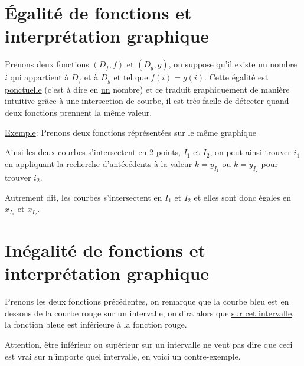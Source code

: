 \documentclass[french]{book}
\begin{document}
\section{Égalité de fonctions et interprétation graphique}

Prenons deux fonctions $(D_f,f)$ et $(D_g,g)$, on suppose qu'il existe un nombre $i$ qui appartient à $D_f$ et à $D_g$ et tel que $f(i)=g(i)$. Cette égalité est \underline{ponctuelle} (c'est à dire en \underline{un} nombre) et ce traduit graphiquement de manière intuitive grâce à une intersection de courbe, il est très facile de détecter quand deux fonctions prennent la même valeur.

\underline{Exemple}: Prenons deux fonctions réprésentées sur le même graphique %
 
\begin{center}
\end{center}

Ainsi les deux courbes s'intersectent en 2 points, $I_1$ et $I_2$, on peut ainsi trouver $i_1$ en appliquant la recherche d'antécédents à la valeur $k=y_{I_1}$ ou $k=y_{I_2}$ pour trouver $i_2$.

Autrement dit, les courbes s'intersectent en $I_1$ et $I_2$ et elles sont donc égales en $x_{I_1}$ et $x_{I_2}$.

\section{Inégalité de fonctions et interprétation graphique}

Prenons les deux fonctions précédentes, on remarque que la courbe bleu est en dessous de la courbe rouge sur un intervalle, on dira alors que \underline{sur cet intervalle}, la fonction bleue est inférieure à la fonction rouge.

Attention, être inférieur ou supérieur sur un intervalle ne veut pas dire que ceci est vrai sur n'importe quel intervalle, en voici un contre-exemple.
\end{document}
